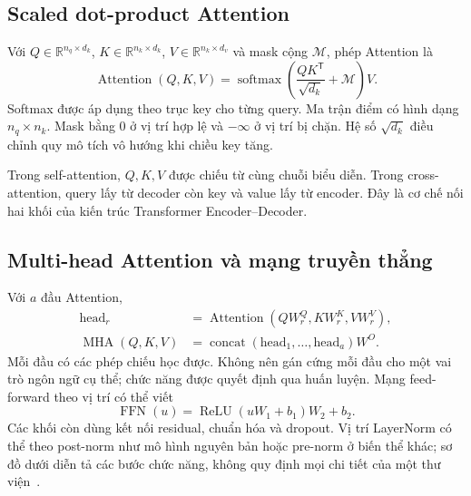 \documentclass[11pt,a4paper]{article}
\numberwithin{equation}{section}
\newcommand{\R}{\mathbb{R}}
\newcommand{\softmax}{\operatorname{softmax}}
\newcommand{\concat}{\operatorname{concat}}
\begin{document}
\subsection{Scaled dot-product Attention}
Với $Q\in\R^{n_q\times d_k}$, $K\in\R^{n_k\times d_k}$, $V\in\R^{n_k\times d_v}$ và mask cộng $\mathcal M$, phép Attention là
\begin{equation}\label{eq:att}
\operatorname{Attention}(Q,K,V)
=\softmax\left(\frac{QK^{\mathsf T}}{\sqrt{d_k}}+\mathcal M\right)V.
\end{equation}
Softmax được áp dụng theo trục key cho từng query. Ma trận điểm có hình dạng $n_q\times n_k$. Mask bằng 0 ở vị trí hợp lệ và $-\infty$ ở vị trí bị chặn. Hệ số $\sqrt{d_k}$ điều chỉnh quy mô tích vô hướng khi chiều key tăng.

Trong self-attention, $Q,K,V$ được chiếu từ cùng chuỗi biểu diễn. Trong cross-attention, query lấy từ decoder còn key và value lấy từ encoder. Đây là cơ chế nối hai khối của kiến trúc Transformer Encoder--Decoder.

\subsection{Multi-head Attention và mạng truyền thẳng}
Với $a$ đầu Attention,
\begin{align}
\mathrm{head}_r&=\operatorname{Attention}(QW_r^Q,KW_r^K,VW_r^V),\\
\operatorname{MHA}(Q,K,V)&=\concat(\mathrm{head}_1,\ldots,\mathrm{head}_a)W^O.
\end{align}
Mỗi đầu có các phép chiếu học được. Không nên gán cứng mỗi đầu cho một vai trò ngôn ngữ cụ thể; chức năng được quyết định qua huấn luyện. Mạng feed-forward theo vị trí có thể viết
\begin{equation}
\operatorname{FFN}(u)=\operatorname{ReLU}(uW_1+b_1)W_2+b_2.
\end{equation}
Các khối còn dùng kết nối residual, chuẩn hóa và dropout. Vị trí LayerNorm có thể theo post-norm như mô hình nguyên bản hoặc pre-norm ở biến thể khác; sơ đồ dưới diễn tả các bước chức năng, không quy định mọi chi tiết của một thư viện~\cite{d2ltransformer}.
\end{document}
